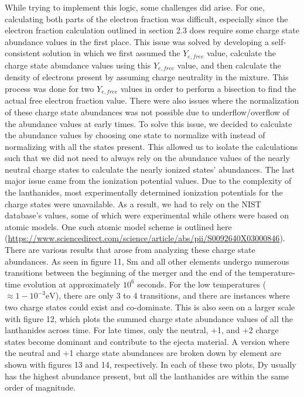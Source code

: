 \documentclass[11pt,a4paper]{article}
\begin{document}
\vspace{.5 cm}


While trying to implement this logic, some challenges did arise. For one, calculating both parts of the electron fraction was difficult, especially since the electron fraction calculation outlined in section 2.3 does require some charge state abundance values in the first place. This issue was solved by developing a self-consistent solution in which we first assumed the $Y_{e,free}$ value, calculate the charge state abundance values using this $Y_{e,free}$ value, and then calculate the density of electrons present by assuming charge neutrality in the mixture. This process was done for two $Y_{e,free}$ values in order to perform a bisection to find the actual free electron fraction value. There were also issues where the normalization of these charge state abundances was not possible due to underflow/overflow of the abundance values at early times. To solve this issue, we decided to calculate the abundance values by choosing one state to normalize with instead of normalizing with all the states present. This allowed us to isolate the calculations such that we did not need to always rely on the abundance values of the nearly neutral charge states to calculate the nearly ionized states' abundances. The last major issue came from the ionization potential values. Due to the complexity of the lanthanides, most experimentally determined ionization potentials for the charge states were unavailable. As a result, we had to rely on the NIST database's values, some of which were experimental while others were based on atomic models. One such atomic model scheme is outlined here (\url{https://www.sciencedirect.com/science/article/abs/pii/S0092640X03000846}).  \\

There are various results that arose from analyzing these charge state abundances. As seen in figure 11, Sm and all other elements undergo numerous transitions between the beginning of the merger and the end of the temperature-time evolution at approximately $10^6$ seconds. For the low temperatures ($\approx 1 - 10^{-3} \mathrm{eV}$), there are only 3 to 4 transitions, and there are instances where two charge states could exist and co-dominate. This is also seen on a larger scale with figure 12, which plots the summed charge state abundance values of all the lanthanides across time. For late times, only the neutral, +1, and +2 charge states become dominant and contribute to the ejecta material. A version where the neutral and +1 charge state abundances are broken down by element are shown with figures 13 and 14, respectively. In each of these two plots, Dy usually has the highest abundance present, but all the lanthanides are within the same order of magnitude.
\end{document}
